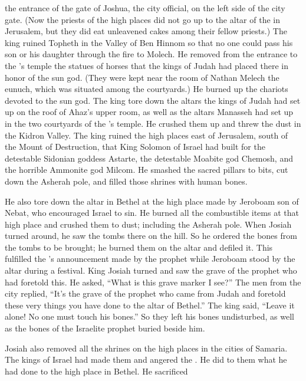 {the entrance
of the gate
of Joshua,
the city
official,
on
the left side
of the city
gate.
(Now the priests
of the high places
did not
go up
to
the altar
of the {}
in Jerusalem,
but
they did eat
unleavened
cakes among
their fellow priests.)
The king ruined
Topheth
in the Valley
of Ben Hinnom
so that no
one
could pass
his son
or his daughter
through the fire
to Molech.
He removed
from the entrance
to
the
{}’s
temple
the statues of horses
that
the kings
of Judah
had placed
there in honor of the sun
god. (They were kept near the room
of Nathan Melech
the eunuch,
which
was situated among the courtyards.) He burned up
the chariots
devoted to the sun god.
The
king
tore
down the altars
the kings
of Judah
had
set up on
the roof
of Ahaz’s
upper
room, as well as
the altars
Manasseh
had
set up in the two
courtyards
of the
{}’s
temple.
He crushed
them up and threw
the
dust
in the Kidron
Valley.
The king
ruined the high places
east of Jerusalem,
south
of the Mount
of Destruction,
that
King
Solomon
of Israel
had built
for the detestable
Sidonian
goddess Astarte,
the detestable
Moabite
god Chemosh,
and the horrible
Ammonite
god Milcom.
He smashed
the sacred pillars
to bits, cut down
the Asherah pole,
and filled
those shrines
with human
bones.
\par }{\PP {}He
also
tore down
the
altar
in Bethel
at the high place
made
by Jeroboam
son
of Nebat,
who encouraged
Israel
to sin.
He
burned
all the combustible
items at that high place
and crushed
them to dust;
including
the Asherah pole.
When Josiah
turned
around, he saw
the
tombs
there
on the hill.
So
he ordered
the bones
from
the tombs
to be brought; he burned
them on
the altar
and defiled
it. This fulfilled
the
{}’s
announcement made by the prophet while Jeroboam
stood by the altar during a festival. King Josiah turned and saw the grave of the prophet
who
had
foretold this.
He asked, “What
is this
grave marker
I
see?” The men
from the city
replied,
“It’s
the grave
of the prophet
who
came
from Judah
and foretold
these
very things you have
done
to the altar
of Bethel.”
The king said,
“Leave
it alone! No
one
must touch
his bones.”
So they left
his bones
undisturbed,
as well as
the bones
of the Israelite prophet buried beside him.
\par }{\PP {}Josiah
also
removed
all
the shrines
on the high places
in the cities
of Samaria.
The kings
of Israel
had
made them and angered
the
{}. He did
to them
what
he had
done
to the high place in Bethel.
He sacrificed
}
